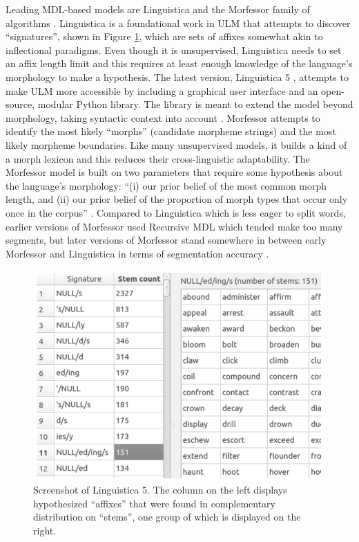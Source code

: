 \documentclass[12pt]{article}
\begin{document}
Leading MDL-based models are Linguistica \cite{goldsmith_linguistica:_2000,goldsmith_unsupervised_2001} and the Morfessor family of algorithms \cite{creutz_unsupervised_2005a,creutz_unsupervised_2007}. Linguistica is a foundational work in ULM that attempts to discover “signatures”, shown in Figure \ref{fig:signatures}, which are sets of affixes somewhat akin to inflectional paradigms. Even though it is unsupervised, Linguistica needs to set an affix length limit and this requires at least enough knowledge of the language’s morphology to make a hypothesis. The latest version, Linguistica 5 \cite{lee_linguistica_2016}, attempts to make ULM more accessible by including a graphical user interface and an open-source, modular Python library. The library is meant to extend the model beyond morphology, taking syntactic context into account \cite{nicolai_morphological_2017}. Morfessor \cite{creutz_unsupervised_2005a,creutz_inducing_2005b,creutz_unsupervised_2007} attempts to identify the most likely ``morphs'' (candidate morpheme strings) and the most likely morpheme boundaries. Like many unsupervised models, it builds a kind of a morph lexicon and this reduces their cross-linguistic adaptability. The Morfessor model is built on two parameters that require some hypothesis about the language's morphology: ``(i) our prior belief of the most common morph length, and (ii) our prior belief of the proportion of morph types that occur only once in the corpus'' \cite[page 281]{creutz_unsupervised_2003}. Compared to Linguistica which is less eager to split words, earlier versions of Morfessor used Recursive MDL which tended make too many segments, but later versions of Morfessor stand somewhere in between early Morfessor and Linguistica in terms of segmentation accuracy \cite{creutz_unsupervised_2003}. 

\begin{figure}[ht]
\label{fig:signatures}
\begin{center}
\includegraphics[width=0.5\columnwidth]{Linguistica5-signatures.PNG}
\caption{Screenshot of Linguistica 5. The column on the left displays hypothesized ``affixes'' that were found in complementary distribution on ``stems'', one group of which is displayed on the right.}
\end{center}
\end{figure}
\end{document}
